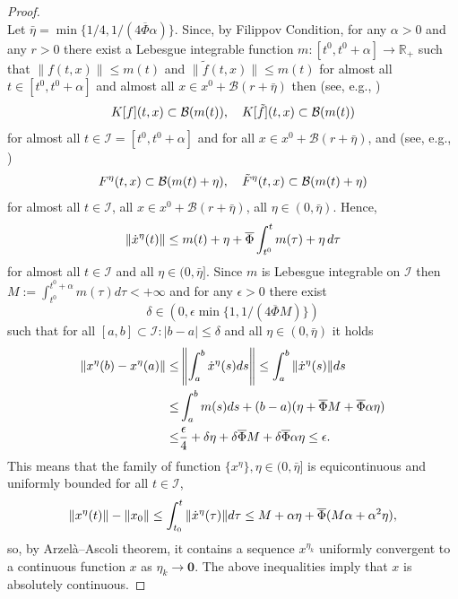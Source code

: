 \documentclass{article}
\newcommand{\R}{\mathbb{R}}
\newcommand{\zero}{\mathbf{0}}
\begin{document}
\begin{proof}
\[\]
Let $\bar \eta=\min\{1/4,1/(4\overline{\Phi}\alpha)\}$.
Since, {by Filippov Condition},  for  any $\alpha>0$ and  any $r>0$ there exist  a Lebesgue integrable  function $m:[t^0,t^0+\alpha] \to \R_+$ such that $\|f(t,x)\|\leq m(t)$ and  $\|\tilde f(t,x)\|\leq m(t)$  for almost all $t\in [t^0,t^0+\alpha]$ and almost all $x\in x^0+\mathcal{B}(r+\bar \eta)$  then (see, e.g., \cite[page 76]{Filippov1988:Book})\vspace{-1mm}
$$
K[f](t,x)\subset \mathcal{B}(m(t)), \quad K[\tilde f](t,x)\subset \mathcal{B}(m(t))\vspace{-1mm}
$$
for almost all $t\in \mathcal{I}=[t^0,t^0+\alpha]$ and for all $x\in x^0+\mathcal{B}(r+\bar \eta)$, and (see, e.g., \cite[page 82]{Filippov1988:Book})\vspace{-1mm}
$$
F^{\eta}(t,x)\subset \mathcal{B}(m(t)+\eta), \quad \tilde F^{\eta}(t,x)\subset \mathcal{B}(m(t)+\eta)\vspace{-1mm}
$$
for almost all $t\!\in\! \mathcal{I}$, all $x\!\in\! x^0+\mathcal{B}(r+\bar \eta)${, all $\eta\!\in\! (0,\bar \eta)$}. 
Hence, %
\vspace{-1mm}
$$
\|\dot x^{\eta}(t)\|\leq m(t)+\eta+\overline{\Phi}\int^t_{t^0}m(\tau)+\eta \,d\tau
\vspace{-1mm}$$
for almost  all $t\in \mathcal{I}$ and all $\eta\in (0,\bar \eta]$.
Since  $m$ is Lebesgue integrable on $\mathcal{I}$ then 
$M:=\int^{t^0+\alpha}_{t^0} m(\tau) d\tau<+\infty$ and 
for any $\epsilon>0$ there exist $$\delta\in (0, \epsilon \min \{1,1/(4\overline{\Phi}M)\})$$
such that 
for all $[a,b]\subset \mathcal{I}: |b-a|\leq \delta$ and 
all $\eta\in \left(0, \bar \eta \right)$  it holds\vspace{-1mm}
\[
\begin{split}
	\|x^{\eta}(b)-x^{\eta}(a)\|\leq& \left\|\int^b_{a}  {\dot x}^{\eta}(s) ds \right\| \leq \int^b_{a}  \|{\dot x}^{\eta}(s)\| ds\\
\leq & \int^b_{a} m(s)ds+(b-a) (\eta+\overline{\Phi}M +\overline{\Phi}\alpha \eta) \\
\leq &\frac{\epsilon}{4}+\delta \eta+\delta \overline{\Phi}M+\delta \overline{\Phi}\alpha \eta\leq \epsilon.\vspace{-1mm}%
\end{split}
\]
This means that the family of function $\{x^{\eta}\}, \eta\in (0,\bar \eta]$ is equicontinuous and uniformly bounded for all $t\in \mathcal{I}$,\vspace{-1mm}
\[
\|x^\eta(t)\|-\|x_0\|\leq \int^t_{t_0}\|\dot x^{\eta}(\tau)\| d\tau\leq M +\alpha  \eta+\overline{\Phi}(M\alpha+\alpha^2 \eta), \vspace{-1mm}
\] so, by Arzel\`a--Ascoli theorem, it contains a sequence $x^{\eta_k}$ uniformly  convergent to a continuous function $x$ as $\eta_k\to \zero$.
The above inequalities imply that $x$ is absolutely continuous.


\end{proof}
\end{document}
